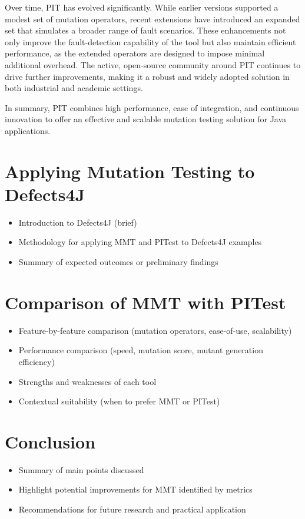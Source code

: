 \documentclass[sigplan, nonacm]{acmart}
\begin{document}
Over time, PIT has evolved significantly. While earlier versions supported a modest set of mutation operators, recent extensions have introduced an expanded set that simulates a broader range of fault scenarios. These enhancements not only improve the fault-detection capability of the tool but also maintain efficient performance, as the extended operators are designed to impose minimal additional overhead. The active, open-source community around PIT continues to drive further improvements, making it a robust and widely adopted solution in both industrial and academic settings.

In summary, PIT combines high performance, ease of integration, and continuous innovation to offer an effective and scalable mutation testing solution for Java applications.

\section{Applying Mutation Testing to Defects4J}
\begin{itemize}
    \item Introduction to Defects4J (brief)
    \item Methodology for applying MMT and PITest to Defects4J examples
    \item Summary of expected outcomes or preliminary findings
\end{itemize}

\section{Comparison of MMT with PITest}
\begin{itemize}
    \item Feature-by-feature comparison (mutation operators, ease-of-use, scalability)
    \item Performance comparison (speed, mutation score, mutant generation efficiency)
    \item Strengths and weaknesses of each tool
    \item Contextual suitability (when to prefer MMT or PITest)
\end{itemize}

\section{Conclusion}
\begin{itemize}
    \item Summary of main points discussed
    \item Highlight potential improvements for MMT identified by metrics
    \item Recommendations for future research and practical application
\end{itemize}



\end{document}
